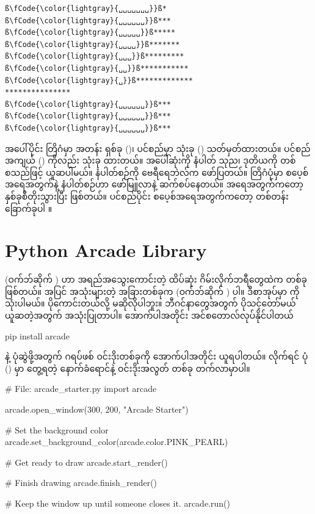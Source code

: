 %
\begin{verbatim}
ß\fCode{\color{lightgray}{␣␣␣␣␣␣␣}}ß*
ß\fCode{\color{lightgray}{␣␣␣␣␣␣}}ß***
ß\fCode{\color{lightgray}{␣␣␣␣␣}}ß*****
ß\fCode{\color{lightgray}{␣␣␣␣}}ß*******
ß\fCode{\color{lightgray}{␣␣␣}}ß*********
ß\fCode{\color{lightgray}{␣␣}}ß***********
ß\fCode{\color{lightgray}{␣}}ß*************
***************
ß\fCode{\color{lightgray}{␣␣␣␣␣␣}}ß***
ß\fCode{\color{lightgray}{␣␣␣␣␣␣}}ß***
ß\fCode{\color{lightgray}{␣␣␣␣␣␣}}ß***
\end{verbatim}
%

အပေါ်ပိုင်း တြိဂံမှာ အတန်း ရှစ်ခု ()၊ ပင်စည်မှာ သုံးခု () သတ်မှတ်ထားတယ်။ ပင်စည် အကျယ် () ကိုလည်း \fCode{*} သုံးခု ထားတယ်။ အပေါ်ဆုံးကို  နံပါတ် သုည၊ ဒုတိယကို တစ် စသည်ဖြင့် ယူဆပါမယ်။  နံပါတ်စဉ်ကို  ဗေရီရေဘဲလ်က ဖော်ပြတယ်။ တြိဂံပုံမှာ  စပေ့စ်အရေအတွက်နဲ့   နံပါတ်စဉ်ဟာ  ဖော်မြူလာနဲ့ ဆက်စပ်နေတယ်။ \fCode{*} အရေအတွက်ကတော့ နှစ်ခုစီတိုးသွားပြီး  ဖြစ်တယ်။ ပင်စည်ပိုင်း စပေ့စ်အရေအတွက်ကတော့ တစ်တန်း ခြောက်ခုပါ  ။


\section{Python Arcade Library} \label{sec:python_arcade}
 (ဝက်ဘ်ဆိုက် ) ဟာ အရည်အသွေးကောင်းတဲ့ ထိပ်ဆုံး  ဂိမ်းလိုက်ဘရီတွေထဲက တစ်ခုဖြစ်တယ်။  အပြင် အသုံးများတဲ့ အခြားတစ်ခုက  (ဝက်ဘ်ဆိုက် ) ပါ။ ဒီစာအုပ်မှာ  ကို သုံးပါမယ်။  ပိုကောင်းတယ်လို့ မဆိုလိုပါဘူး။ ဘီဂင်နာတွေအတွက် ပိုသင့်တော်မယ် ယူဆတဲ့အတွက် အသုံးပြုတာပါ။ အောက်ပါအတိုင်း အင်စတောလ်လုပ်နိုင်ပါတယ်
\begin{codetxt}
pip install arcade
\end{codetxt}

  နဲ့ ပုံဆွဲဖို့အတွက် ဂရပ်ဖစ် ဝင်းဒိုးတစ်ခုကို အောက်ပါအတိုင်း ယူရပါတယ်။  လိုက်ရင် ပုံ (\fRefNo{\ref{fig:ch07starter}}) မှာ တွေ့ရတဲ့ နောက်ခံရောင်နဲ့ ဝင်းဒိုးအလွတ် တစ်ခု တက်လာမှာပါ။
%
\begin{py}
# File: arcade_starter.py
import arcade

arcade.open_window(300, 200, "Arcade Starter")

# Set the background color
arcade.set_background_color(arcade.color.PINK_PEARL)

# Get ready to draw
arcade.start_render()

# Finish drawing
arcade.finish_render()

# Keep the window up until someone closes it.
arcade.run()

\end{py}
%


